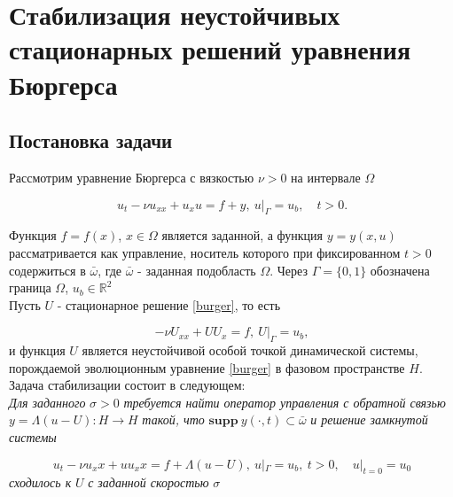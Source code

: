 \chapter{Стабилизация неустойчивых стационарных решений уравнения Бюргерса}


\section{Постановка задачи}
\vspace{1em}

Рассмотрим уравнение Бюргерса с вязкостью $\nu > 0$ на интервале $\Omega$

\begin{equation}\label{burger}
    u_t - \nu u_{xx} + u_x u = f + y, \ u|_{\Gamma} = u_b, \quad t > 0.
\end{equation}

Функция $f = f(x)$, $x \in \Omega$ является заданной, а функция $y = y(x, u)$
рассматривается как управление, носитель которого при фиксированном $t > 0$
содержиться в $\bar{\omega}$, где $\bar{\omega}$ - заданная подобласть $\Omega$.
Через $\Gamma = \{0, 1\}$ обозначена граница $\Omega$, $u_b \in \mathbb{R}^2$\\

Пусть $U$ - стационарное решение \eqref{burger}, то есть

\begin{equation}\label{stationary_sol}
    -\nu U_{xx} + U U_x = f, \ U|_{\Gamma} = u_b,
\end{equation}
и функция $U$ является неустойчивой особой точкой динамической системы, порождаемой
эволюционным уравнение \eqref{burger} в фазовом пространстве $H$.
Задача стабилизации состоит в следующем:\\

\textit{Для заданного} $\sigma > 0$ 
\textit{требуется найти оператор управления с обратной связью} 
$y = \Lambda(u - U) : H \to H$ \textit{такой, что} $\mathbf{supp} \ y (\cdot,t) \subset 
\bar{\omega}$ \textit{и решение замкнутой системы}

\begin{equation}
    u_t - \nu u_xx + u u_xx = f + \Lambda(u - U), \ u|_{\Gamma} = u_b,
    \ t > 0, \quad u|_{t=0} = u_0
\end{equation}
\textit{сходилось к} $U$ \textit{с заданной скоростью} $\sigma$

